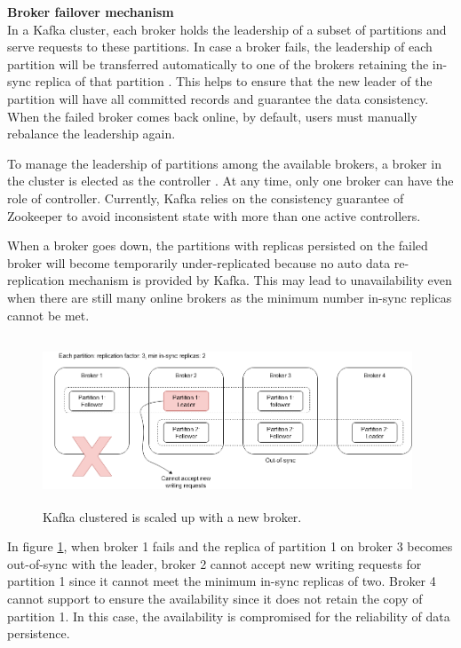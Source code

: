 \textbf{Broker failover mechanism}\\
In a Kafka cluster, each broker holds the leadership of a subset of partitions and serve requests to these partitions. In case a broker fails, the leadership of each partition will be transferred automatically to one of the brokers retaining the in-sync replica of that partition \cite{kafkaleader}. This helps to ensure that the new leader of the partition will have all committed records and guarantee the data consistency. When the failed broker comes back online, by default, users must manually rebalance the leadership again. 

To manage the leadership of partitions among the available brokers, a broker in the cluster is elected as the controller \cite{kafkaleaderelection}. At any time, only one broker can have the role of controller. Currently, Kafka relies on the consistency guarantee of Zookeeper to avoid inconsistent state with more than one active controllers. 

When a broker goes down, the partitions with replicas persisted on the failed broker will become temporarily under-replicated because no auto data re-replication mechanism is provided by Kafka. This may lead to unavailability even when there are still many online brokers as the minimum number in-sync replicas cannot be met. 

\begin{figure}[h]
	\centering
	\includegraphics[width=11cm,height=5cm]{images/broker-failover-kafka.png}
	\caption{Kafka clustered is scaled up with a new broker.}
	\label{fig:brokerfailoverkafka}
\end{figure}
In figure \ref{fig:brokerfailoverkafka}, when broker 1 fails and the replica of partition 1 on broker 3 becomes out-of-sync with the leader, broker 2 cannot accept new writing requests for partition 1 since it cannot meet the minimum in-sync replicas of two. Broker 4 cannot support to ensure the availability since it does not retain the copy of partition 1. In this case, the availability is compromised for the reliability of data persistence.

